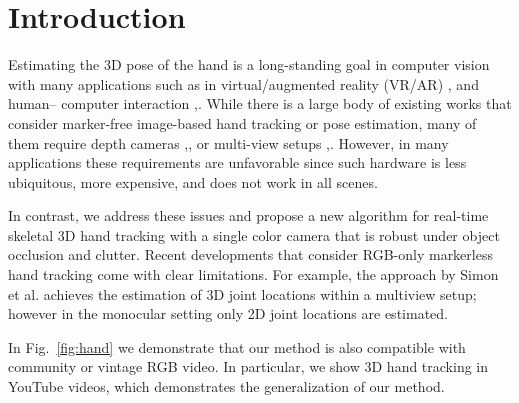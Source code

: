 \documentclass[10pt,twocolumn,letterpaper]{article}
\begin{document}
\section{Introduction}
Estimating the 3D pose of the hand is a long-standing
goal in computer vision with many applications such as in
virtual/augmented reality (VR/AR) \cite{Lee2009Multithreaded},\cite{Piumsomboon2013UGA} and human–
computer interaction \cite{Feit2015Investigating},\cite{Markussen2014Vulture}. While there is a large body
of existing works that consider marker-free image-based
hand tracking or pose estimation, many of them require
depth cameras \cite{Sharp2015Accurate},\cite{Taylor2016Efficient},\cite{Srinath_2016_CVPR} or multi-view 
setups \cite{Sridhar2014Real},\cite{Ballan2012Motion}. However, in many applications these
requirements are unfavorable since such hardware is less
ubiquitous, more expensive, and does not work in all scenes.\par
In contrast, we address these issues and propose a new
algorithm for real-time skeletal 3D hand tracking with a
single color camera that is robust under object occlusion
and clutter. Recent developments that consider RGB-only
markerless hand tracking come with clear limitations.
For example, the approach by Simon et al.
achieves the estimation of 3D joint locations within a multiview
setup; however in the monocular setting only 2D joint
locations are estimated. \par
In Fig.~\ref{fig:hand} we demonstrate that our method
is also compatible with community or vintage RGB video.
In particular, we show 3D hand tracking in YouTube videos,
which demonstrates the generalization of our method.\par


{\small


}
\end{document}
